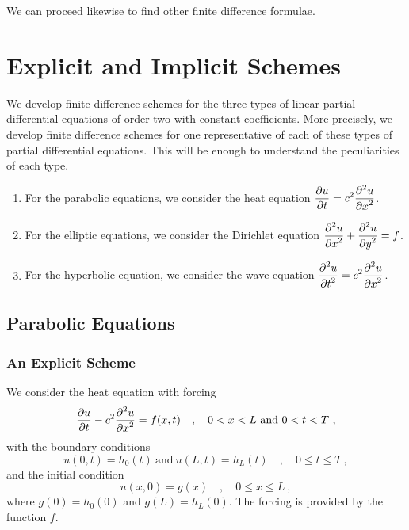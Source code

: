 We can proceed likewise to find other finite difference formulae.

\section{Explicit and Implicit Schemes}\label{EXplImplSchenes}

We develop finite difference schemes for the three types of linear
partial differential equations of order two with constant
coefficients.  More precisely, we develop finite difference schemes
for one representative of each of these types of partial differential
equations. This will be enough to understand the peculiarities of each
type.

\begin{enumerate}
\item For the parabolic equations, we consider the heat equation
$\displaystyle \frac{\partial{u}}{\partial{t}} = c^2 \frac{\displaystyle \partial^{2}{u}} {\displaystyle \partial{x}^{2}}$.
\item For the elliptic equations, we consider the Dirichlet equation
$\displaystyle \frac{\displaystyle \partial^{2}{u}} {\displaystyle \partial{x}^{2}} + \frac{\displaystyle \partial^{2}{u}} {\displaystyle \partial{y}^{2}} = f$.
\item For the hyperbolic equation, we consider the wave equation
$\displaystyle \frac{\displaystyle \partial^{2}{u}} {\displaystyle \partial{t}^{2}} = c^2 \frac{\displaystyle \partial^{2}{u}} {\displaystyle \partial{x}^{2}}$.
\end{enumerate}

\subsection{Parabolic Equations}

\subsubsection{An Explicit Scheme}

We consider the heat equation with forcing
\begin{equation} \label{HeatEqu}
\frac{\partial{u}}{\partial{t}} - c^2 \frac{\displaystyle \partial^{2}{u}} {\displaystyle \partial{x}^{2}} = f(x,t) \quad , \quad 0 < x < L \
\text{and} \ 0<t<T \ ,
\end{equation}
with the boundary conditions
\begin{equation} \label{HeatEquBC}
u(0,t)=h_0(t) \ \text{and} \ u(L,t)=h_L(t) \quad , \quad 0\leq t \leq T \ ,
\end{equation}
and the initial condition
\begin{equation} \label{HeatEquIC}
u(x,0) = g(x) \quad , \quad 0 \leq x \leq L \ ,
\end{equation}
where $g(0)=h_0(0)$ and $g(L)=h_L(0)$.  The forcing is provided by the
function $f$.

